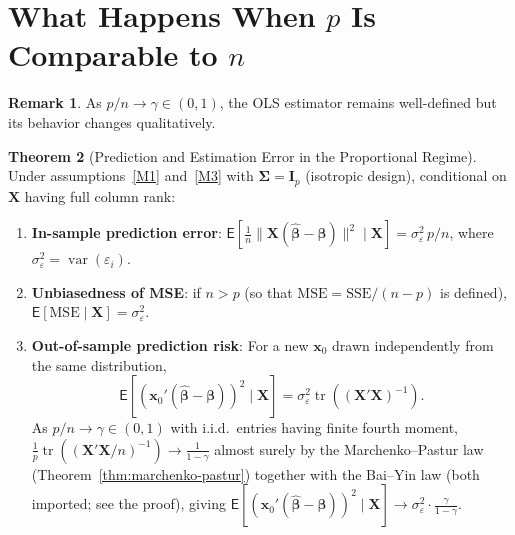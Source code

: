 \documentclass[12pt,a4paper]{article}
\theoremstyle{definition}
\newtheorem{theorem}{Theorem}[section]
\newtheorem{remark}[theorem]{Remark}
\newcommand\expc{\mathsf{E}}
\DeclareMathOperator\var{var}
\DeclareMathOperator\tr{tr}
\newcommand{\SSE}{\mathrm{SSE}}
\newcommand{\MSE}{\mathrm{MSE}}
\newcommand{\bX}{\mathbf{X}}
\newcommand{\bx}{\mathbf{x}}
\def\bb{\boldsymbol{\beta}}
\newcommand{\bI}{\mathbf{I}}
\newcommand{\bSigma}{\boldsymbol{\Sigma}}
\newcommand{\hbb}{\hat{\boldsymbol{\beta}}}
\begin{document}
\section{What Happens When \texorpdfstring{$p$}{p} Is Comparable to \texorpdfstring{$n$}{n}}\label{sec:p-comparable-n}

\begin{remark}
As $p/n \to \gamma \in (0,1)$, the OLS estimator remains well-defined but its behavior changes qualitatively.
\end{remark}

\begin{theorem}[Prediction and Estimation Error in the Proportional Regime]\label{thm:proportional-prediction}
Under assumptions~\ref{M1} and~\ref{M3} with $\bSigma = \bI_p$ (isotropic design), conditional on $\bX$ having full column rank:
\begin{enumerate}[label=\textup{(\roman*)}]
\item\label{pp:in} \textbf{In-sample prediction error}: $\expc[\frac{1}{n}\|\bX(\hbb-\bb)\|^2 \mid \bX] = \sigma_\varepsilon^2\,p/n$, where $\sigma_\varepsilon^2 = \var(\varepsilon_i)$.
\item\label{pp:mse} \textbf{Unbiasedness of MSE}: if $n > p$ (so that $\MSE = \SSE/(n-p)$ is defined), $\expc[\MSE \mid \bX] = \sigma_\varepsilon^2$.
\item\label{pp:oos} \textbf{Out-of-sample prediction risk}: For a new $\bx_0$ drawn independently from the same distribution,
\begin{equation}\label{eq:oos-risk}
\expc[(\bx_0'(\hbb-\bb))^2 \mid \bX] = \sigma_\varepsilon^2\tr((\bX'\bX)^{-1}).
\end{equation}
As $p/n \to \gamma \in (0,1)$ with i.i.d.\ entries having finite fourth moment, $\frac{1}{p}\tr((\bX'\bX/n)^{-1}) \to \frac{1}{1-\gamma}$ almost surely by the Marchenko--Pastur law (Theorem~\ref{thm:marchenko-pastur}) together with the Bai--Yin law (both imported; see the proof), giving $\expc[(\bx_0'(\hbb-\bb))^2 \mid \bX] \to \sigma_\varepsilon^2\cdot\frac{\gamma}{1-\gamma}$.
\end{enumerate}
\end{theorem}
\end{document}
